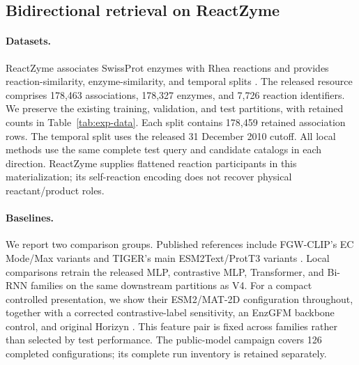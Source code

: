 \subsection{Bidirectional retrieval on ReactZyme}
\label{sec:exp-reactzyme}

\paragraph{Datasets.}
ReactZyme associates SwissProt enzymes with Rhea reactions and provides
reaction-similarity, enzyme-similarity, and temporal splits
\citep{hua2024reactzyme}. The released resource comprises 178,463
associations, 178,327 enzymes, and 7,726 reaction identifiers. We preserve
the existing training, validation, and test partitions, with retained counts
in Table~\ref{tab:exp-data}. Each split contains 178,459 retained association
rows. The temporal split uses the released 31 December 2010 cutoff. All
local methods use the same complete test query and candidate catalogs in
each direction. ReactZyme supplies flattened reaction participants in this
materialization; its self-reaction encoding does not recover physical
reactant/product roles.

\begin{table}[t]
\centering\small
\caption{ReactZyme partitions used by every local method. Train/validation/test
columns count association rows; $|R_{\rm test}|$ and $|E_{\rm test}|$ are
the complete test catalogs, whose query/candidate roles swap by direction.}
\label{tab:exp-data}

\end{table}

\paragraph{Baselines.}
We report two comparison groups. Published references include FGW-CLIP's
EC Mode/Max variants and TIGER's main ESM2Text/ProtT3 variants
\citep{zhou2026fgwclip,zhang2026tiger}. Local comparisons retrain the released
MLP, contrastive MLP, Transformer, and Bi-RNN families on the same downstream
partitions as V4. For a compact controlled presentation, we show their
ESM2/MAT-2D configuration throughout, together with a corrected contrastive-label
sensitivity, an EnzGFM backbone control, and original Horizyn
\citep{rocks2026horizyn}. This feature pair is fixed across families rather
than selected by test performance. The public-model campaign covers 126
completed configurations; its complete run inventory is retained separately.

